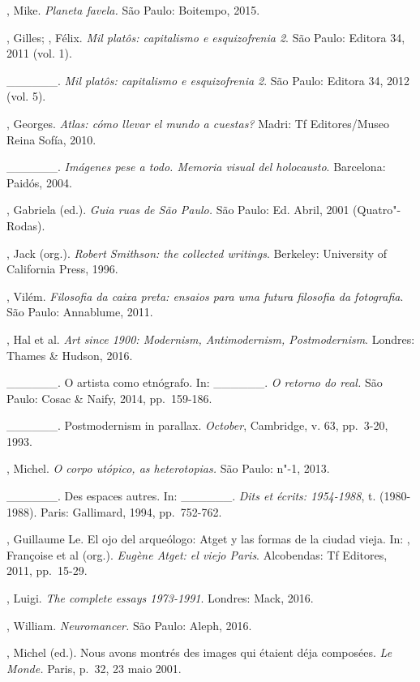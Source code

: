 \begin{Parskip}
, Mike. \emph{Planeta favela.} São Paulo: Boitempo, 2015.

, Gilles; , Félix. \emph{Mil platôs: capitalismo e
esquizofrenia 2}. São Paulo: Editora 34, 2011 (vol. 1).

\_\_\_\_\_\_. \emph{Mil platôs: capitalismo e esquizofrenia 2}.
São Paulo: Editora 34, 2012 (vol. 5).

, Georges. \emph{Atlas: cómo llevar el mundo a cuestas?}
Madri: Tf Editores/Museo Reina Sofía, 2010.

\_\_\_\_\_\_. \emph{Imágenes pese a todo. Memoria visual del holocausto}. Barcelona: Paidós, 2004.

, Gabriela (ed.). \emph{Guia ruas de São Paulo.} São Paulo: Ed.
Abril, 2001 (Quatro"-Rodas).

, Jack (org.). \emph{Robert Smithson: the collected writings}.
Berkeley: University of California Press, 1996.

, Vilém. \emph{Filosofia da caixa preta: ensaios para uma
futura filosofia da fotografia}. São Paulo: Annablume, 2011.

, Hal et al. \emph{Art since 1900: Modernism, Antimodernism,
Postmodernism}. Londres: Thames \& Hudson, 2016.

\_\_\_\_\_\_. O artista como etnógrafo. In: \_\_\_\_\_\_.
\emph{O retorno do real.} São Paulo: Cosac \& Naify, 2014, pp.~159-186.

\_\_\_\_\_\_. Postmodernism in parallax. \emph{October},
Cambridge, v. 63, pp.~3-20, 1993.

, Michel. \emph{O corpo utópico, as heterotopias.} São Paulo:
n"-1, 2013.

\_\_\_\_\_\_. Des espaces autres. In: \_\_\_\_\_\_. \emph{Dits
et écrits: 1954-1988}, t.  (1980-1988). Paris: Gallimard, 1994, pp.~752-762.

, Guillaume Le. El ojo del arqueólogo: Atget y las formas de la
ciudad vieja. In: , Françoise et al (org.). \emph{Eugène
Atget: el viejo Paris}. Alcobendas: Tf Editores, 2011, pp.~15-29.

, Luigi. \emph{The complete essays 1973-1991}. Londres: Mack,
2016.

, William. \emph{Neuromancer.} São Paulo: Aleph, 2016.

, Michel (ed.). Nous avons montrés des images qui étaient déja
composées. \emph{Le Monde.} Paris, p.~32, 23 maio 2001.


\end{Parskip}
